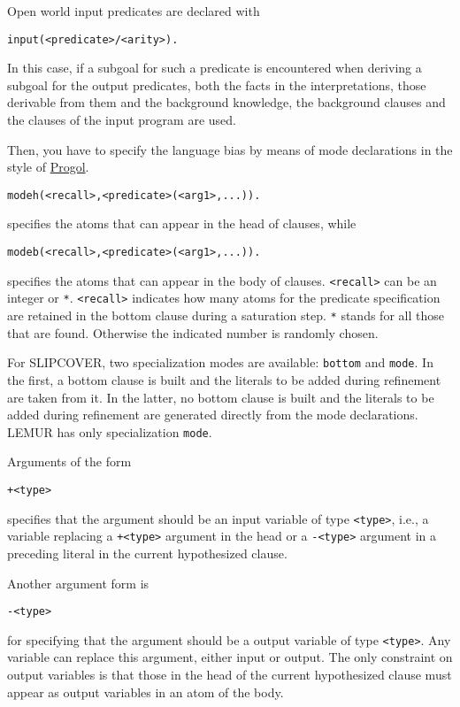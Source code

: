 Open world input predicates are declared with
\begin{verbatim}
input(<predicate>/<arity>).
\end{verbatim}
In this case, if a subgoal for such a predicate is encountered when deriving a subgoal for the output predicates, 
both the facts in the interpretations, those derivable from them and the background knowledge, the background clauses and the clauses of the input program are used.

Then, you have to specify the language bias by means of mode declarations in the style of 
\href{http://www.doc.ic.ac.uk/\string ~shm/progol.html}{Progol}.
\begin{verbatim}
modeh(<recall>,<predicate>(<arg1>,...)).
\end{verbatim}
specifies the atoms that can appear in the head of clauses, while
\begin{verbatim}
modeb(<recall>,<predicate>(<arg1>,...)).
\end{verbatim}
specifies the atoms that can appear in the body of clauses.
\texttt{<recall>} can be an integer or \texttt{*}.
\texttt{<recall>} indicates how many atoms for the predicate specification are
retained in the bottom clause during a saturation step. \texttt{*} stands for all those that are found. Otherwise the indicated number is randomly chosen.

For SLIPCOVER, two specialization modes are available: \verb|bottom| and \verb|mode|.
In the first, a bottom clause is built and the literals to be added during 
refinement are taken from it. In the latter, no bottom clause is built and
the literals to be added during refinement are generated 
directly from the mode declarations. 
LEMUR has only specialization \verb|mode|.

Arguments of the form
\begin{verbatim}
+<type>
\end{verbatim}
specifies that the argument should be an input variable of type \texttt{<type>}, i.e., a variable replacing a \texttt{+<type>} argument in the head or a \texttt{-<type>} argument in a preceding literal in the current hypothesized clause.

Another argument form is
\begin{verbatim}
-<type>
\end{verbatim}
for specifying that the argument should be a output variable of type \texttt{<type>}. 
Any variable can replace this argument, either input or output.
The only constraint on output variables is that those in the head of the current hypothesized 
clause must appear as output variables in an atom of the body.


